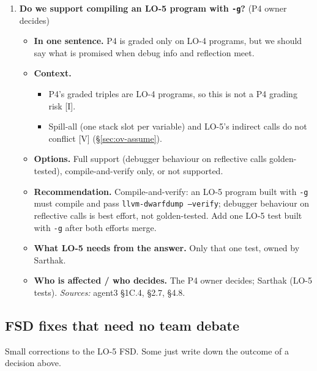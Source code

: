 \documentclass[10pt]{article}
\newcommand{\code}[1]{\texttt{\small #1}}
\newcommand{\mV}{\textsf{\scriptsize[V]}}
\newcommand{\mI}{\textsf{\scriptsize[I]}}
\newcommand{\field}[1]{\textbf{#1}\enspace}
\newcommand{\decitem}[1]{\needspace{6\baselineskip}\setcounter{enumi}{\numexpr#1-1\relax}\item}
\begin{document}
\begin{enumerate}[label=\textbf{\arabic*.},ref=\arabic*,leftmargin=1.8em,itemsep=0.8em]
\decitem{17}\label{dec:gplus}\textbf{Do we support compiling an LO-5 program with \code{-g}?} (P4 owner decides)
\begin{itemize}
\item[] \field{In one sentence.} P4 is graded only on LO-4 programs, but we should say what is promised when debug info and reflection meet.
\item[] \field{Context.}
\begin{itemize}
\item P4's graded triples are LO-4 programs, so this is not a P4 grading risk \mI.
\item Spill-all (one stack slot per variable) and LO-5's indirect calls do not conflict \mV{} (\S\ref{sec:ov-assume}).
\end{itemize}
\item[] \field{Options.} Full support (debugger behaviour on reflective calls golden-tested), compile-and-verify only, or not supported.
\item[] \field{Recommendation.} Compile-and-verify: an LO-5 program built with \code{-g} must compile and pass \code{llvm-dwarfdump --verify}; debugger behaviour on reflective calls is best effort, not golden-tested. Add one LO-5 test built with \code{-g} after both efforts merge.
\item[] \field{What LO-5 needs from the answer.} Only that one test, owned by Sarthak.
\item[] \field{Who is affected / who decides.} The P4 owner decides; Sarthak (LO-5 tests). \emph{Sources:} agent3 §1C.4, §2.7, §4.8.
\end{itemize}
\end{enumerate}

\subsection*{FSD fixes that need no team debate}
Small corrections to the LO-5 FSD. Some just write down the outcome of a decision above.
\end{document}
